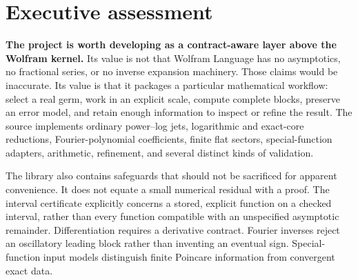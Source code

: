 \documentclass[11pt,a4paper]{article}
\newcommand{\code}[1]{\texttt{\detokenize{#1}}}
\begin{document}
\begin{abstract}
The repository is a substantial real-asymptotic computation library, not
merely a wrapper around \code{InverseSeries}. Its strongest contribution is
an explicit computational representation of scales, branches, complete
coefficient blocks, transported remainders, and reusable inverse
computations. It complements Wolfram Language's considerably broader
symbolic-analysis system. This review identifies two concrete hazards in
the optional \code{SeriesData} export path, an observable-power option
precedence problem, and a source-derived example of under-refinement caused
by a fixed precision margin. It also examines expensive canonicalization,
resource budgeting, native-series ingestion, validation provenance,
certificate scope, API consistency, and migration costs. The recommendations
prioritize preserving mathematical contracts and making achieved precision
observable before adding more function families. The accompanying artifacts
separate executed independent checks from unexecuted native regression tests
and conservative patch proposals.
\end{abstract}
\tableofcontents
\newpage

\section{Executive assessment}
\label{sec:executive}
\textbf{The project is worth developing as a contract-aware layer above the
Wolfram kernel.} Its value is not that Wolfram Language has no asymptotics,
no fractional series, or no inverse expansion machinery. Those claims would
be inaccurate. Its value is that it packages a particular mathematical
workflow: select a real germ, work in an explicit scale, compute complete
blocks, preserve an error model, and retain enough information to inspect or
refine the result. The source implements ordinary power--log jets,
logarithmic and exact-core reductions, Fourier-polynomial coefficients,
finite flat sectors, special-function adapters, arithmetic, refinement, and
several distinct kinds of validation.\cite{readme,core,seriesops,fourier,sourcecoords}

The library also contains safeguards that should not be sacrificed for
apparent convenience. It does not equate a small numerical residual with a
proof. The interval certificate explicitly concerns a stored, explicit
function on a checked interval, rather than every function compatible with
an unspecified asymptotic remainder. Differentiation requires a derivative
contract. Fourier inverses reject an oscillatory leading block rather than
inventing an eventual sign. Special-function input models distinguish finite
Poincare information from convergent exact data.\cite{certificates,seriesops,fourier,special}
\end{document}
